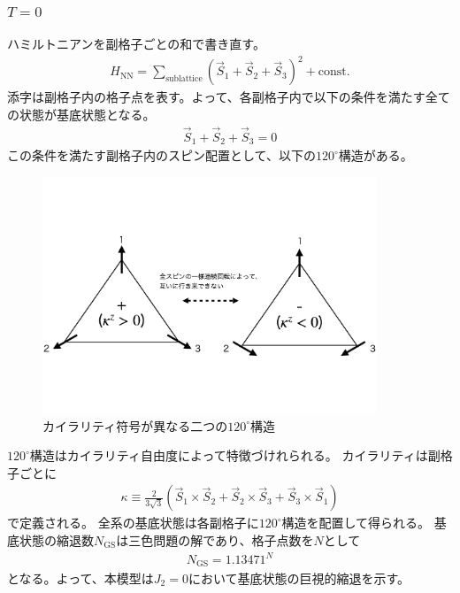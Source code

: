 \documentclass[12pt,titlepage,dvipdfmx]{jarticle}
\begin{document}
\subsubsection{$T=0$}
ハミルトニアンを副格子ごとの和で書き直す。
\begin{align}
   H_{\mathrm{NN}} = \sum_{\mathrm{sublattice}} (\vec{S}_1+\vec{S}_2+\vec{S}_3)^2 + \mathrm{const.}
\end{align}
添字は副格子内の格子点を表す。よって、各副格子内で以下の条件を満たす全ての状態が基底状態となる。
\begin{align}
   \vec{S}_1+\vec{S}_2+\vec{S}_3 = 0
\end{align}
この条件を満たす副格子内のスピン配置として、以下の$120^\circ$構造がある。
\begin{figure}[H]
   \centering
   \includegraphics[width=10cm]{figure/120degs_structures.pdf}
   \caption{カイラリティ符号が異なる二つの$120^\circ$構造}
\end{figure}

$120^\circ$構造はカイラリティ自由度によって特徴づけれられる。
カイラリティは副格子ごとに
\begin{align}
   \kappa \equiv \frac{2}{3\sqrt{3}}(\vec S_1 \times \vec S_2 + \vec S_2 \times \vec S_3 + \vec S_3 \times \vec S_1)
\end{align}
で定義される。
全系の基底状態は各副格子に$120^\circ$構造を配置して得られる。
基底状態の縮退数$N_{\mathrm{GS}}$は三色問題の解であり、格子点数を$N$として
\begin{align}
   N_{\mathrm{GS}} = 1.13471^{N}
\end{align}
となる\cite{Baxter2003}。よって、本模型は$J_2=0$において基底状態の巨視的縮退を示す。

\end{document}
